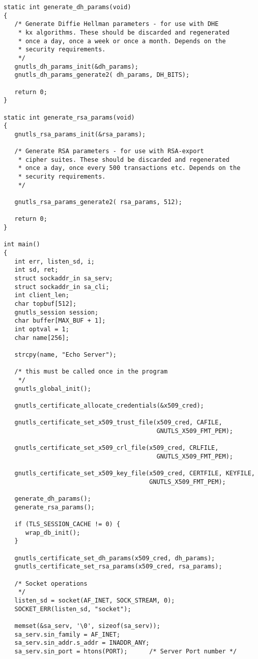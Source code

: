 \begin{verbatim}
static int generate_dh_params(void)
{
   /* Generate Diffie Hellman parameters - for use with DHE
    * kx algorithms. These should be discarded and regenerated
    * once a day, once a week or once a month. Depends on the
    * security requirements.
    */
   gnutls_dh_params_init(&dh_params);
   gnutls_dh_params_generate2( dh_params, DH_BITS);

   return 0;
}

static int generate_rsa_params(void)
{
   gnutls_rsa_params_init(&rsa_params);

   /* Generate RSA parameters - for use with RSA-export
    * cipher suites. These should be discarded and regenerated
    * once a day, once every 500 transactions etc. Depends on the
    * security requirements.
    */

   gnutls_rsa_params_generate2( rsa_params, 512);

   return 0;
}

int main()
{
   int err, listen_sd, i;
   int sd, ret;
   struct sockaddr_in sa_serv;
   struct sockaddr_in sa_cli;
   int client_len;
   char topbuf[512];
   gnutls_session session;
   char buffer[MAX_BUF + 1];
   int optval = 1;
   char name[256];

   strcpy(name, "Echo Server");

   /* this must be called once in the program
    */
   gnutls_global_init();

   gnutls_certificate_allocate_credentials(&x509_cred);

   gnutls_certificate_set_x509_trust_file(x509_cred, CAFILE,
                                          GNUTLS_X509_FMT_PEM);

   gnutls_certificate_set_x509_crl_file(x509_cred, CRLFILE,
                                          GNUTLS_X509_FMT_PEM);

   gnutls_certificate_set_x509_key_file(x509_cred, CERTFILE, KEYFILE,
                                        GNUTLS_X509_FMT_PEM);

   generate_dh_params();
   generate_rsa_params();

   if (TLS_SESSION_CACHE != 0) {
      wrap_db_init();
   }

   gnutls_certificate_set_dh_params(x509_cred, dh_params);
   gnutls_certificate_set_rsa_params(x509_cred, rsa_params);

   /* Socket operations
    */
   listen_sd = socket(AF_INET, SOCK_STREAM, 0);
   SOCKET_ERR(listen_sd, "socket");

   memset(&sa_serv, '\0', sizeof(sa_serv));
   sa_serv.sin_family = AF_INET;
   sa_serv.sin_addr.s_addr = INADDR_ANY;
   sa_serv.sin_port = htons(PORT);      /* Server Port number */


\end{verbatim}
